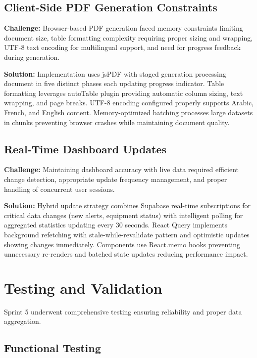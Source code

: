 \subsection{Client-Side PDF Generation Constraints}

\textbf{Challenge:} Browser-based PDF generation faced memory constraints limiting document size, table formatting complexity requiring proper sizing and wrapping, UTF-8 text encoding for multilingual support, and need for progress feedback during generation.

\textbf{Solution:} Implementation uses jsPDF with staged generation processing document in five distinct phases each updating progress indicator. Table formatting leverages autoTable plugin providing automatic column sizing, text wrapping, and page breaks. UTF-8 encoding configured properly supports Arabic, French, and English content. Memory-optimized batching processes large datasets in chunks preventing browser crashes while maintaining document quality.

\subsection{Real-Time Dashboard Updates}

\textbf{Challenge:} Maintaining dashboard accuracy with live data required efficient change detection, appropriate update frequency management, and proper handling of concurrent user sessions.

\textbf{Solution:} Hybrid update strategy combines Supabase real-time subscriptions for critical data changes (new alerts, equipment status) with intelligent polling for aggregated statistics updating every 30 seconds. React Query implements background refetching with stale-while-revalidate pattern and optimistic updates showing changes immediately. Components use React.memo hooks preventing unnecessary re-renders and batched state updates reducing performance impact.

\section{Testing and Validation}

Sprint 5 underwent comprehensive testing ensuring reliability and proper data aggregation.

\subsection{Functional Testing}

